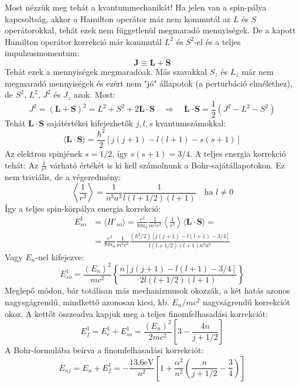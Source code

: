 \documentclass[../main.tex]{subfiles}
\begin{document}
Most nézzük meg tehát a kvantummechanikát! Ha jelen van a spin-pálya kapcsoltság, akkor a Hamilton operátor már nem kommutál az $L$ és $S$ operátorokkal, tehát ezek nem függetlenül megmaradó mennyiségek.
De a kapott Hamilton operátor korrekció már kommutál $L^2$ és $S^2$-el és a teljes impulzusmomentum:
\begin{equation}
    \mathbf{J} \equiv \mathbf{L} + \mathbf{S}
\end{equation}
Tehát ezek a mennyiségek megmaradóak. Más szavakkal $S_z$ és $L_z$ már nem megmaradó mennyiségek és ezért nem "jó" állapotok (a perturbáció elmélethez), de $S^2$, $L^2$, $J^2$ és $J_z$ azok.
Most:
\begin{equation}
    J^2 = (\mathbf{L} + \mathbf{S})^2 = L^2 + S^2 + 2 \mathbf{L} \cdot \mathbf{S} \quad \Rightarrow \quad \mathbf{L} \cdot \mathbf{S} = \frac{1}{2} (J^2 - L^2 - S^2)
\end{equation}
Tehát $\mathbf{L} \cdot \mathbf{S}$ sajátértékei kifejezhetők $j, l, s$ kvantumszámokkal:
\begin{equation}
    \langle \mathbf{L} \cdot \mathbf{S} \rangle = \frac{\hbar^2}{2} \left[ j(j+1) - l(l+1) - s(s+1) \right]
\end{equation}
Az elektron spinjének $s = 1/2$, így $s(s+1) = 3/4$. A teljes energia korrekció tehát:
Az $\frac{1}{r^3}$ várható értékét is ki kell számolnunk a Bohr-sajátállapotokon. Ez nem triviális, de a végeredmény:
\begin{equation}
    \left\langle \frac{1}{r^3} \right\rangle = \frac{1}{n^3 a^3} \frac{1}{l (l + 1/2)(l + 1)} \quad \text{ha } l \neq 0
\end{equation}
Így a teljes spin-körpálya energia korrekció:
\begin{equation}
    \begin{aligned}
        E^1_{so} &= \langle H'_{so} \rangle = \frac{e^2}{8 \pi \epsilon_0} \frac{1}{m^2 c^2} \left\langle \frac{1}{r^3} \right\rangle \langle \mathbf{L} \cdot \mathbf{S} \rangle = \\
        &= \frac{e^2}{8 \pi \epsilon_0} \frac{1}{m^2 c^2} \frac{(\hbar^2 / 2) \left[j (j + 1) - l(l + 1) - 3/4\right]}{l (l + 1/2)(l + 1) n^3 a^3}
    \end{aligned}
\end{equation}
Vagy $E_n$-nel kifejezve:
\begin{equation}
    E^1_{so} = \frac{(E_n)^2}{m c^2} \left\{\frac{n [j (j + 1) - l (l + 1) - 3/4]}{2 l (l + 1/2)(l + 1)}\right\}
\end{equation}
Meglepő módon, bár totálisan más mechanizmusok okozzák, a két hatás azonos nagysgágrendű, mindkettő azonosan kicsi, kb. $E_n/mc^2$ nagyságrendű korrekciót okoz.
A kettőt összeadva kapjuk meg a teljes finomfelhasadási korrekciót:
\begin{equation}
    E^1_{f} = E^1_{r} + E^1_{so} = \frac{(E_n)^2}{2 m c^2} \left[ 3 - \frac{4 n}{j + 1/2} \right]
\end{equation}
A Bohr-formulába beírva a finomfelhasadási korrekciót:
\begin{equation}
    \boxed{E_{n j} = E_n + E^1_{f} = - \frac{13.6 \text{eV}}{n^2} \left[ 1 + \frac{\alpha^2}{n^2} \left( \frac{n}{j + 1/2} - \frac{3}{4} \right) \right]}
\end{equation}
\end{document}
